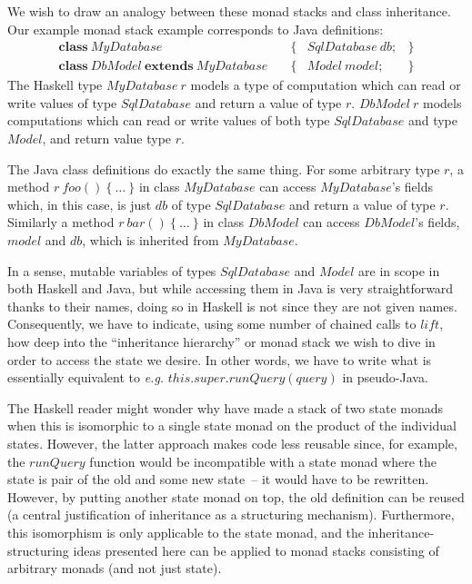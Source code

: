 We wish to draw an analogy between these monad stacks and class inheritance.
Our example monad stack example corresponds to Java definitions:
\begin{displaymath}
\begin{array}{lclc}
\mathbf{class}~\mathit{MyDatabase} & \quad \{ & \mathit{SqlDatabase}~\mathit{db}; & \} \\
\mathbf{class}~\mathit{DbModel}~\mathbf{extends}~\mathit{MyDatabase} & \quad \{ & \mathit{Model}~\mathit{model}; & \}
\end{array}
\end{displaymath}
The Haskell type $\mathit{MyDatabase}~r$ models a type of computation which can read or write values of type $\mathit{SqlDatabase}$ and return a value of type $r$. $\mathit{DbModel}~r$ models computations which can read or write values of both type $\mathit{SqlDatabase}$ and type $\mathit{Model}$, and return value type $r$.

The Java class definitions do exactly the same thing. For some arbitrary type $r$, a method $r~\mathit{foo}()~\{~\ldots~\}$ in class $\mathit{MyDatabase}$ can access $\mathit{MyDatabase}$'s fields which, in this case, is just $\mathit{db}$ of type $\mathit{SqlDatabase}$ and return a value of type $r$.  Similarly a method $r~\mathit{bar}()~\{~\ldots~\}$ in class $\mathit{DbModel}$ can access $\mathit{DbModel}$'s fields, $\mathit{model}$ and $\mathit{db}$, which is inherited from $\mathit{MyDatabase}$. 

In a sense, mutable variables of types $\mathit{SqlDatabase}$ and $\mathit{Model}$ are in scope in both Haskell and Java, but while accessing them in Java is very straightforward thanks to their names, doing so in Haskell is not since they are not given names. Consequently, we have to indicate, using some number of chained calls to $\mathit{lift}$, how deep into the ``inheritance hierarchy'' or monad stack we wish to dive in order to access the state we desire. In other words, we have to write what is essentially equivalent to \emph{e.g.} $\mathit{this}.\mathit{super}.\mathit{runQuery}(\mathit{query})$ in pseudo-Java. 

The Haskell reader might wonder why have made a stack of two state monads
when this is isomorphic to a single state monad on the product of the
individual states.
However, the latter approach makes code less reusable since, for example, the $\mathit{runQuery}$ function would be incompatible with a state monad where the state is pair of the old and some new state~-- it would have to be rewritten. However, by putting another state monad on top, the old definition can be reused
(a central justification of inheritance as a structuring mechanism).
Furthermore, this isomorphism is only applicable to the state monad, and
the inheritance-structuring ideas presented here can be applied to monad stacks consisting of arbitrary monads (and not just state).


